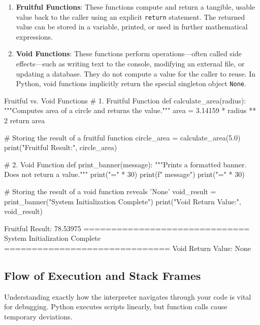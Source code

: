 \begin{enumerate}[leftmargin=1.5em]
    \item \textbf{Fruitful Functions}: These functions compute and return a tangible, usable value back to the caller using an explicit \texttt{return} statement. The returned value can be stored in a variable, printed, or used in further mathematical expressions.
    \item \textbf{Void Functions}: These functions perform operations—often called side effects—such as writing text to the console, modifying an external file, or updating a database. They do not compute a value for the caller to reuse. In Python, void functions implicitly return the special singleton object \texttt{None}.
\end{enumerate}

\begin{pythoncode}{Fruitful vs. Void Functions}
# 1. Fruitful Function
def calculate_area(radius):
    """Computes area of a circle and returns the value."""
    area = 3.14159 * radius ** 2
    return area

# Storing the result of a fruitful function
circle_area = calculate_area(5.0)
print("Fruitful Result:", circle_area)

# 2. Void Function
def print_banner(message):
    """Prints a formatted banner. Does not return a value."""
    print("=" * 30)
    print(f" {message}")
    print("=" * 30)

# Storing the result of a void function reveals 'None'
void_result = print_banner("System Initialization Complete")
print("Void Return Value:", void_result)
\end{pythoncode}

\begin{outputbox}
Fruitful Result: 78.53975
==============================
 System Initialization Complete
==============================
Void Return Value: None
\end{outputbox}

\subsection{Flow of Execution and Stack Frames}
Understanding exactly how the interpreter navigates through your code is vital for debugging. Python executes scripts linearly, but function calls cause temporary deviations.

